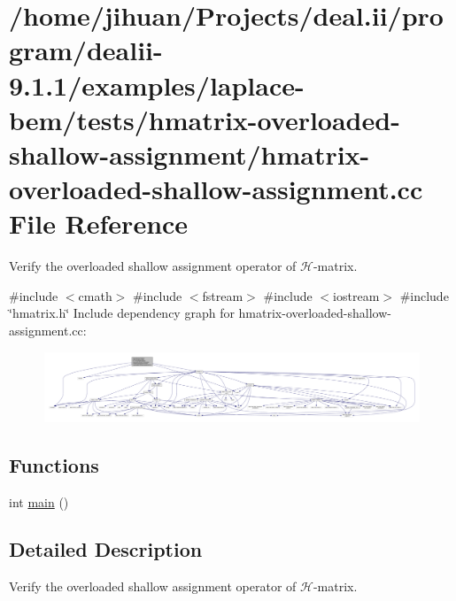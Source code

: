 \hypertarget{hmatrix-overloaded-shallow-assignment_8cc}{}\section{/home/jihuan/\+Projects/deal.ii/program/dealii-\/9.1.1/examples/laplace-\/bem/tests/hmatrix-\/overloaded-\/shallow-\/assignment/hmatrix-\/overloaded-\/shallow-\/assignment.cc File Reference}
\label{hmatrix-overloaded-shallow-assignment_8cc}


Verify the overloaded shallow assignment operator of $\mathcal{H}$-\/matrix.  


{\ttfamily \#include $<$cmath$>$}\newline
{\ttfamily \#include $<$fstream$>$}\newline
{\ttfamily \#include $<$iostream$>$}\newline
{\ttfamily \#include \char`\"{}hmatrix.\+h\char`\"{}}\newline
Include dependency graph for hmatrix-\/overloaded-\/shallow-\/assignment.cc\+:
\nopagebreak
\begin{figure}[H]
\begin{center}
\leavevmode
\includegraphics[width=350pt]{hmatrix-overloaded-shallow-assignment_8cc__incl}
\end{center}
\end{figure}
\subsection*{Functions}
\begin{DoxyCompactItemize}
\item 
int \hyperlink{hmatrix-overloaded-shallow-assignment_8cc_ae66f6b31b5ad750f1fe042a706a4e3d4}{main} ()
\end{DoxyCompactItemize}


\subsection{Detailed Description}
Verify the overloaded shallow assignment operator of $\mathcal{H}$-\/matrix. 

